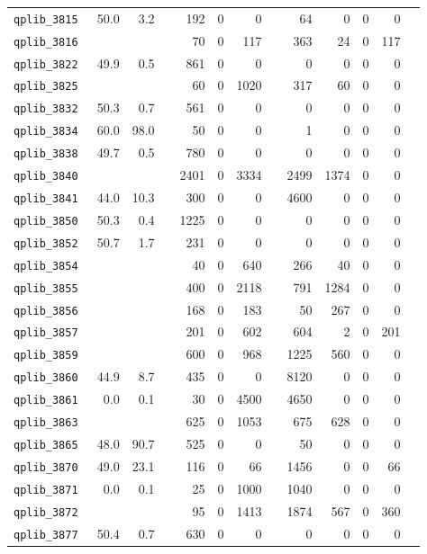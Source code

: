 {\begin{longtable}{lrrrrrrrrrrrr}
{\tt 	qplib\_3815	}	&	50.0	&	3.2	&	&	192	&	0	&	0	&	&	64	&	0	&	0	&	0	\\
{\tt 	qplib\_3816	}	&		&		&	&	70	&	0	&	117	&	&	363	&	24	&	0	&	117	\\
{\tt 	qplib\_3822	}	&	49.9	&	0.5	&	&	861	&	0	&	0	&	&	0	&	0	&	0	&	0	\\
{\tt 	qplib\_3825	}	&		&		&	&	60	&	0	&	1020	&	&	317	&	60	&	0	&	0	\\
{\tt 	qplib\_3832	}	&	50.3	&	0.7	&	&	561	&	0	&	0	&	&	0	&	0	&	0	&	0	\\
{\tt 	qplib\_3834	}	&	60.0	&	98.0	&	&	50	&	0	&	0	&	&	1	&	0	&	0	&	0	\\
{\tt 	qplib\_3838	}	&	49.7	&	0.5	&	&	780	&	0	&	0	&	&	0	&	0	&	0	&	0	\\
{\tt 	qplib\_3840	}	&		&		&	&	2401	&	0	&	3334	&	&	2499	&	1374	&	0	&	0	\\
{\tt 	qplib\_3841	}	&	44.0	&	10.3	&	&	300	&	0	&	0	&	&	4600	&	0	&	0	&	0	\\
{\tt 	qplib\_3850	}	&	50.3	&	0.4	&	&	1225	&	0	&	0	&	&	0	&	0	&	0	&	0	\\
{\tt 	qplib\_3852	}	&	50.7	&	1.7	&	&	231	&	0	&	0	&	&	0	&	0	&	0	&	0	\\
{\tt 	qplib\_3854	}	&		&		&	&	40	&	0	&	640	&	&	266	&	40	&	0	&	0	\\
{\tt 	qplib\_3855	}	&		&		&	&	400	&	0	&	2118	&	&	791	&	1284	&	0	&	0	\\
{\tt 	qplib\_3856	}	&		&		&	&	168	&	0	&	183	&	&	50	&	267	&	0	&	0	\\
{\tt 	qplib\_3857	}	&		&		&	&	201	&	0	&	602	&	&	604	&	2	&	0	&	201	\\
{\tt 	qplib\_3859	}	&		&		&	&	600	&	0	&	968	&	&	1225	&	560	&	0	&	0	\\
{\tt 	qplib\_3860	}	&	44.9	&	8.7	&	&	435	&	0	&	0	&	&	8120	&	0	&	0	&	0	\\
{\tt 	qplib\_3861	}	&	0.0	&	0.1	&	&	30	&	0	&	4500	&	&	4650	&	0	&	0	&	0	\\
{\tt 	qplib\_3863	}	&		&		&	&	625	&	0	&	1053	&	&	675	&	628	&	0	&	0	\\
{\tt 	qplib\_3865	}	&	48.0	&	90.7	&	&	525	&	0	&	0	&	&	50	&	0	&	0	&	0	\\
{\tt 	qplib\_3870	}	&	49.0	&	23.1	&	&	116	&	0	&	66	&	&	1456	&	0	&	0	&	66	\\
{\tt 	qplib\_3871	}	&	0.0	&	0.1	&	&	25	&	0	&	1000	&	&	1040	&	0	&	0	&	0	\\
{\tt 	qplib\_3872	}	&		&		&	&	95	&	0	&	1413	&	&	1874	&	567	&	0	&	360	\\
{\tt 	qplib\_3877	}	&	50.4	&	0.7	&	&	630	&	0	&	0	&	&	0	&	0	&	0	&	0	\\

\end{longtable}}
